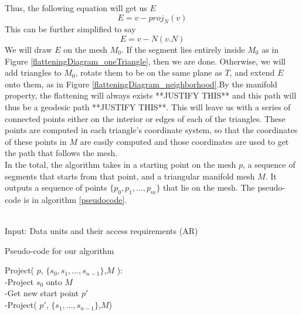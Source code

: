 \documentclass[conference]{acmsiggraph}
\begin{document}
Thus, the following equation will get us $E$
\[
E = v - proj_N(v)
\]
This can be further simplified to say
\[
E = v - N(v.N)
\]
We will draw $E$ on the mesh $M_0$. If the segment lies entirely inside $M_0$ as in Figure \ref{flatteningDiagram_oneTriangle}, then we are done. Otherwise, we will add triangles to $M_0$, rotate them to be on the same plane as $T$, and extend $E$ onto them, as in Figure \ref{flatteningDiagram_neighborhood}.By the manifold property, the flattening will always exists **JUSTIFY THIS** and this path will thus be a geodesic path **JUSTIFY THIS**. This will leave us with a series of connected points either on the interior or edges of each of the triangles. These points are computed in each triangle's coordinate system, so that the coordinates of these points in $M$ are easily computed and those coordinates are used to get the path that follows the mesh.\\
In the total, the algorithm takes in a starting point on the mesh $p$, a sequence of segments that starts from that point, and a triangular manifold mesh $M$. It outputs a sequence of points $\{ p_0, p_1, ... , p_m\}$ that lie on the mesh. The pseudo-code is in algorithm \ref{pseudocode}.\\
\\
\begin{algorithm}[t]
Input: Data units and their access requirements (AR) \;
\caption{Pseudo-code for our algorithm}
\label{pseudocode}
\end{algorithm}
Project( $p$, $\{s_0,s_1,...,s_{n-1}\}$,$M$ ):\\
-Project $s_0$ onto $M$\\
-Get new start point $p'$\\
-Project( $p'$, $\{s_1,...,s_{n-1}\}$,$M$)\\ 
\\
\end{document}
